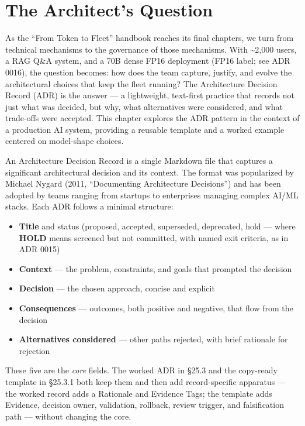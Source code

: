 \section*{The Architect's Question}\label{the-architects-question}

As the ``From Token to Fleet'' handbook reaches its final chapters, we
turn from technical mechanisms to the governance of those mechanisms.
With \textasciitilde2,000 users, a RAG Q\&A system, and a 70B dense FP16
deployment (FP16 label; see ADR 0016), the question becomes: how does
the team capture, justify, and evolve the architectural choices that
keep the fleet running? The Architecture Decision Record (ADR) is the
answer --- a lightweight, text-first practice that records not just what
was decided, but why, what alternatives were considered, and what
trade-offs were accepted. This chapter explores the ADR pattern in the
context of a production AI system, providing a reusable template and a
worked example centered on model-shape choices.

\label{concept}


An Architecture Decision Record is a single Markdown file that captures
a significant architectural decision and its context. The format was
popularized by Michael Nygard (2011, ``Documenting Architecture
Decisions'') and has been adopted by teams ranging from startups to
enterprises managing complex AI/ML stacks. Each ADR follows a minimal
structure:

\begin{itemize}
\tightlist
\item
  \textbf{Title} and status (proposed, accepted, superseded, deprecated,
  hold --- where \textbf{HOLD} means screened but not committed, with
  named exit criteria, as in ADR 0015)
\item
  \textbf{Context} --- the problem, constraints, and goals that prompted
  the decision
\item
  \textbf{Decision} --- the chosen approach, concise and explicit
\item
  \textbf{Consequences} --- outcomes, both positive and negative, that
  flow from the decision
\item
  \textbf{Alternatives considered} --- other paths rejected, with brief
  rationale for rejection
\end{itemize}

These five are the \emph{core} fields. The worked ADR in §25.3 and the
copy-ready template in §25.3.1 both keep them and then add
record-specific apparatus --- the worked record adds a Rationale and
Evidence Tags; the template adds Evidence, decision owner, validation,
rollback, review trigger, and falsification path --- without changing
the core.

